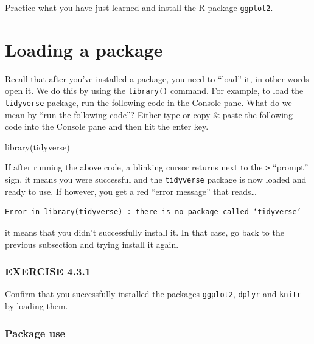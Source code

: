 \documentclass[
]{book}
\newenvironment{Shaded}{\begin{snugshade}}{\end{snugshade}}
\newcommand{\FunctionTok}[1]{\textcolor[rgb]{0.00,0.00,0.00}{#1}}
\newcommand{\NormalTok}[1]{#1}
\begin{document}
Practice what you have just learned and install the R package \texttt{ggplot2}.

\hypertarget{loading-a-package}{%
\section{Loading a package}\label{loading-a-package}}

Recall that after you've installed a package, you need to ``load'' it, in other words open it. We do this by using the \texttt{library()} command. For example, to load the \texttt{tidyverse} package, run the following code in the Console pane. What do we mean by ``run the following code''? Either type or copy \& paste the following code into the Console pane and then hit the enter key.

\begin{Shaded}
\begin{Highlighting}[]
\FunctionTok{library}\NormalTok{(tidyverse)}
\end{Highlighting}
\end{Shaded}

If after running the above code, a blinking cursor returns next to the \texttt{\textgreater{}} ``prompt'' sign, it means you were successful and the \texttt{tidyverse} package is now loaded and ready to use. If however, you get a red ``error message'' that reads\ldots{}

\begin{verbatim}
Error in library(tidyverse) : there is no package called ‘tidyverse’
\end{verbatim}

it means that you didn't successfully install it. In that case, go back to the previous subsection and trying install it again.

\hypertarget{exercise-4.3.1}{%
\subsubsection*{EXERCISE 4.3.1}\label{exercise-4.3.1}}

Confirm that you successfully installed the packages \texttt{ggplot2}, \texttt{dplyr} and \texttt{knitr} by loading them.

\hypertarget{package-use}{%
\subsubsection*{Package use}\label{package-use}}
\end{document}
